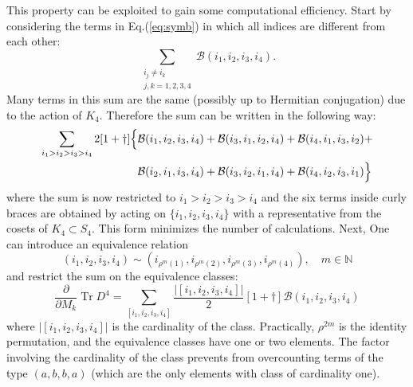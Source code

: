 \documentclass[12pt,a4paper]{article}
\DeclareMathOperator{\Tr}{Tr}
\begin{document}
This property can be exploited to gain some computational efficiency.\newline
Start by considering the terms in Eq.(\ref{eq:symb}) in which all indices are different from each other:
\begin{equation}
\sum_{\substack{i_j \neq i_k \\ j,k=1,2,3,4}} \mathcal{B}(i_1, i_2, i_3, i_4).
\end{equation}
Many terms in this sum are the same (possibly up to Hermitian conjugation) due to the action of $K_4$. Therefore the sum can be written in the following way:
\begin{align}
\sum_{i_1 > i_2 > i_3 > i_4} 2[1+\dagger] \Big\{ &\mathcal{B}(i_1, i_2, i_3, i_4) + \mathcal{B}(i_3, i_1, i_2, i_4) + \mathcal{B}(i_4, i_1, i_3, i_2) + \notag \\ 
&\mathcal{B}(i_2, i_1, i_3, i_4) + \mathcal{B}(i_3, i_2, i_1, i_4) + \mathcal{B}(i_4, i_2, i_3, i_1) \Big\}
\end{align}
where the sum is now restricted to $i_1 > i_2 > i_3 > i_4$ and the six terms inside curly braces are obtained by acting on $\{i_1, i_2, i_3, i_4\}$ with a representative from the cosets of $K_4 \subset S_4$. This form minimizes the number of calculations.\newline
Next, 
\newline
\newline
\newline
\newline
\newline
\newline
\newline
\newline
One can introduce an equivalence relation
\begin{equation}
(i_1, i_2, i_3, i_4) \sim (i_{\rho^m(1)}, i_{\rho^m(2)}, i_{\rho^m(3)}, i_{\rho^m(4)}), \quad m \in \mathbb{N}
\end{equation}
and restrict the sum on the equivalence classes:
\begin{equation}\label{eq:trunc}
\frac{\partial}{\partial M_k} \Tr D^4 = \sum_{[i_1, i_2, i_3, i_4]} \frac{|[i_1, i_2, i_3, i_4]|}{2} [1+\dagger]\mathcal{B}(i_1, i_2, i_3, i_4)
\end{equation}
where $|[i_1, i_2, i_3, i_4]|$ is the cardinality of the class. Practically, $\rho^{2m}$ is the identity permutation, and the equivalence classes have one or two elements. The factor involving the cardinality of the class prevents from overcounting terms of the type $(a, b, b, a)$ (which are the only elements with class of cardinality one).\newline
\end{document}
